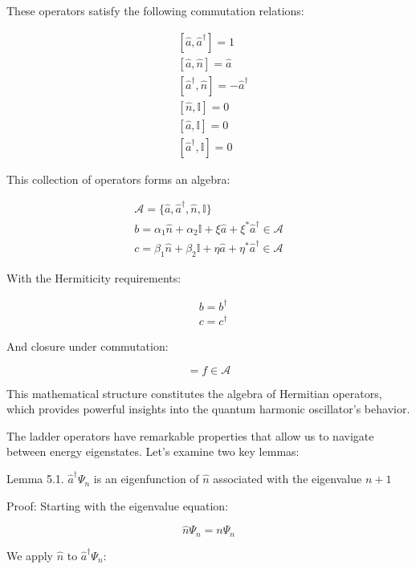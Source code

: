 \documentclass[italian]{HKNdocument}
\begin{document}
These operators satisfy the following commutation relations:

\begin{align}
&[\hat{a}, \hat{a}^\dagger] = 1 \\
&[\hat{a}, \hat{n}] = \hat{a} \\
&[\hat{a}^\dagger, \hat{n}] = -\hat{a}^\dagger  \\
&[\hat{n}, \mathbb{I}] = 0 \\
&[\hat{a}, \mathbb{I}] = 0 \\
&[\hat{a}^\dagger, \mathbb{I}] = 0
\end{align}

This collection of operators forms an algebra:

\begin{gather}
\mathcal{A} = \{\hat{a}, \hat{a}^\dagger, \hat{n}, \mathbb{I}\}  \\
b = \alpha_1\hat{n} + \alpha_2\mathbb{I} + \xi\hat{a} + \xi^*\hat{a}^\dagger \in \mathcal{A} \\
c = \beta_1\hat{n} + \beta_2\mathbb{I} + \eta\hat{a} + \eta^*\hat{a}^\dagger \in \mathcal{A}
\end{gather}

With the Hermiticity requirements:

\begin{align}
&b = b^\dagger \\
&c = c^\dagger
\end{align}

And closure under commutation:

\begin{equation}
[b,c] = f \in \mathcal{A}
\end{equation}

This mathematical structure constitutes the algebra of Hermitian operators, which provides powerful insights into the quantum harmonic oscillator's behavior.

The ladder operators have remarkable properties that allow us to navigate between energy eigenstates. Let's examine two key lemmas:

Lemma 5.1. $\hat{a}^\dagger\Psi_n$ is an eigenfunction of $\hat{n}$ associated with the eigenvalue $n+1$

Proof:
Starting with the eigenvalue equation:

\begin{equation}
\hat{n}\Psi_n = n\Psi_n
\end{equation}

We apply $\hat{n}$ to $\hat{a}^\dagger\Psi_n$:
\end{document}
